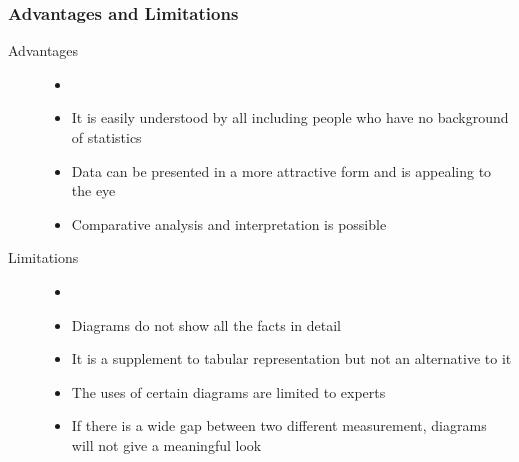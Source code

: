 \documentclass[
10pt, %
a4paper, %
]{report}
\begin{document}
\subsubsection*{Advantages and Limitations}
\begin{description}
\item[Advantages]
\begin{itemize}
\item[]
\item It is easily understood by all including people who have no background of statistics
\item Data can be presented in a more attractive form and is appealing to the eye
\item Comparative analysis and interpretation is possible
\end{itemize}
\item[Limitations]
\begin{itemize}
\item[]
\item Diagrams do not show all the facts in detail
\item It is a supplement to tabular representation but not an alternative to it
\item The uses of certain diagrams are limited to
experts
\item If there is a wide gap between two different measurement, diagrams will not give a
meaningful look
\end{itemize}
\end{description}
\end{document}
